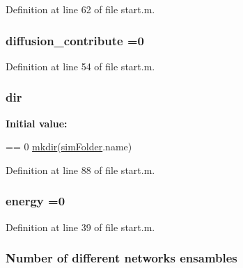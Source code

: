Definition at line 62 of file start.\+m.

\hypertarget{a00113_a9341167cb56ed18499df723220990b9c}{
\subsubsection[{diffusion\+\_\+contribute}]{\setlength{\rightskip}{0pt plus 5cm}diffusion\+\_\+contribute =0}}\label{a00113_a9341167cb56ed18499df723220990b9c}


Definition at line 54 of file start.\+m.

\hypertarget{a00113_a4ca269cf93df1b512b52174c1a256fe5}{
\subsubsection[{dir}]{\setlength{\rightskip}{0pt plus 5cm}dir}}\label{a00113_a4ca269cf93df1b512b52174c1a256fe5}
{\bfseries Initial value\+:}
\begin{DoxyCode}
== 0
    \hyperlink{a00110_ae58a11ed5ac7873b1039a391d5c86a05}{mkdir}(\hyperlink{a00028_a0ffb8131632b48d9111c3a27d91262e2}{simFolder}.name)
\end{DoxyCode}


Definition at line 88 of file start.\+m.

\hypertarget{a00113_ac002779c383d2cc783e881f94449de66}{
\subsubsection[{energy}]{\setlength{\rightskip}{0pt plus 5cm}energy =0}}\label{a00113_ac002779c383d2cc783e881f94449de66}


Definition at line 39 of file start.\+m.

\hypertarget{a00113_a450b0c257ca2430779e4244700c076e7}{
\subsubsection[{ensambles}]{\setlength{\rightskip}{0pt plus 5cm}Number of different networks ensambles}}\label{a00113_a450b0c257ca2430779e4244700c076e7}


